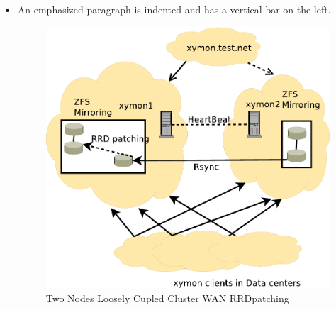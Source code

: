 \begin{itemize}
\item An emphasized paragraph is indented and has a vertical bar on the
left.
\begin{figure}[H]
\caption{Two Nodes Loosely Cupled Cluster WAN RRDpatching}
\label{fig:TwoNodeLooselyCpupledClusterWAN-RRDpatching}
\begin{center}
\includegraphics[scale=0.65]{dia/TwoNodeLooselyCpupledClusterWAN-RRDpatching.pdf}
\end{center}
\end{figure}

\end{itemize}

